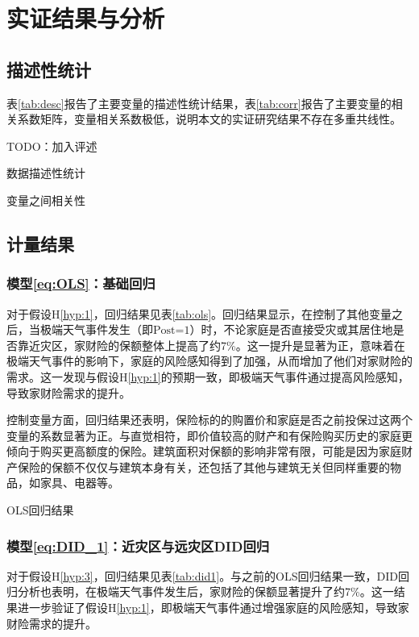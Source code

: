 \chapter{实证结果与分析}\label{chap:4}
\section{描述性统计}

表\ref{tab:desc}报告了主要变量的描述性统计结果，表\ref{tab:corr}报告了主要变量的相关系数矩阵，变量相关系数极低，说明本文的实证研究结果不存在多重共线性。

TODO：加入评述
\begin{table}[H]
    \caption{数据描述性统计}\label{tab:desc}
    \centering
    
\end{table}
\begin{table}[H]
    \caption{变量之间相关性}\label{tab:corr}
    \centering
    
\end{table}

\section{计量结果}
\subsection{模型\ref{eq:OLS}：基础回归}
对于假设H\ref{hyp:1}，回归结果见表\ref{tab:ols}。回归结果显示，在控制了其他变量之后，当极端天气事件发生（即$\text{Post=1}$）时，不论家庭是否直接受灾或其居住地是否靠近灾区，家财险的保额整体上提高了约7\%。这一提升是显著为正，意味着在极端天气事件的影响下，家庭的风险感知得到了加强，从而增加了他们对家财险的需求。这一发现与假设H\ref{hyp:1}的预期一致，即极端天气事件通过提高风险感知，导致家财险需求的提升。

控制变量方面，回归结果还表明，保险标的的购置价和家庭是否之前投保过这两个变量的系数显著为正。与直觉相符，即价值较高的财产和有保险购买历史的家庭更倾向于购买更高额度的保险。建筑面积对保额的影响非常有限，可能是因为家庭财产保险的保额不仅仅与建筑本身有关，还包括了其他与建筑无关但同样重要的物品，如家具、电器等。

\begin{table}[htbp]
    \centering
    \caption{OLS回归结果}\label{tab:ols}
    
\end{table}

\subsection{模型\ref{eq:DID_1}：近灾区与远灾区DID回归}
对于假设H\ref{hyp:3}，回归结果见表\ref{tab:did1}。与之前的OLS回归结果一致，DID回归分析也表明，在极端天气事件发生后，家财险的保额显著提升了约7\%。这一结果进一步验证了假设H\ref{hyp:1}，即极端天气事件通过增强家庭的风险感知，导致家财险需求的提升。

